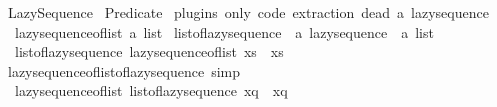 %
\begin{isabellebody}%
%
%
\isadelimdocument
%
\endisadelimdocument
%
\isatagdocument
%
\isamarkuptrue%
%
\endisatagdocument
{\isafolddocument}%
%
\isadelimdocument
%
\endisadelimdocument
%
\isadelimtheory
%
\endisadelimtheory
%
\isatagtheory
{}\isamarkupfalse%
\ Lazy{\isacharunderscore}{\kern0pt}Sequence\isanewline
{}\ Predicate\isanewline
{}%
\endisatagtheory
{\isafoldtheory}%
%
\isadelimtheory
%
\endisadelimtheory
%
\isadelimdocument
%
\endisadelimdocument
%
\isatagdocument
%
\isamarkuptrue%
%
\endisatagdocument
{\isafolddocument}%
%
\isadelimdocument
%
\endisadelimdocument
{}\isamarkupfalse%
\ {\isacharparenleft}{\kern0pt}plugins\ only{\isacharcolon}{\kern0pt}\ code\ extraction{\isacharparenright}{\kern0pt}\ {\isacharparenleft}{\kern0pt}dead\ {\isacharprime}{\kern0pt}a{\isacharparenright}{\kern0pt}\ lazy{\isacharunderscore}{\kern0pt}sequence\ {\isacharequal}{\kern0pt}\isanewline
\ \ lazy{\isacharunderscore}{\kern0pt}sequence{\isacharunderscore}{\kern0pt}of{\isacharunderscore}{\kern0pt}list\ {\isachardoublequoteopen}{\isacharprime}{\kern0pt}a\ list{\isachardoublequoteclose}\isanewline
\isanewline
{}\isamarkupfalse%
\ list{\isacharunderscore}{\kern0pt}of{\isacharunderscore}{\kern0pt}lazy{\isacharunderscore}{\kern0pt}sequence\ {\isacharcolon}{\kern0pt}{\isacharcolon}{\kern0pt}\ {\isachardoublequoteopen}{\isacharprime}{\kern0pt}a\ lazy{\isacharunderscore}{\kern0pt}sequence\ {\isasymRightarrow}\ {\isacharprime}{\kern0pt}a\ list{\isachardoublequoteclose}\isanewline
{}\isanewline
\ \ {\isachardoublequoteopen}list{\isacharunderscore}{\kern0pt}of{\isacharunderscore}{\kern0pt}lazy{\isacharunderscore}{\kern0pt}sequence\ {\isacharparenleft}{\kern0pt}lazy{\isacharunderscore}{\kern0pt}sequence{\isacharunderscore}{\kern0pt}of{\isacharunderscore}{\kern0pt}list\ xs{\isacharparenright}{\kern0pt}\ {\isacharequal}{\kern0pt}\ xs{\isachardoublequoteclose}\isanewline
\isanewline
{}\isamarkupfalse%
\ lazy{\isacharunderscore}{\kern0pt}sequence{\isacharunderscore}{\kern0pt}of{\isacharunderscore}{\kern0pt}list{\isacharunderscore}{\kern0pt}of{\isacharunderscore}{\kern0pt}lazy{\isacharunderscore}{\kern0pt}sequence\ {\isacharbrackleft}{\kern0pt}simp{\isacharbrackright}{\kern0pt}{\isacharcolon}{\kern0pt}\isanewline
\ \ {\isachardoublequoteopen}lazy{\isacharunderscore}{\kern0pt}sequence{\isacharunderscore}{\kern0pt}of{\isacharunderscore}{\kern0pt}list\ {\isacharparenleft}{\kern0pt}list{\isacharunderscore}{\kern0pt}of{\isacharunderscore}{\kern0pt}lazy{\isacharunderscore}{\kern0pt}sequence\ xq{\isacharparenright}{\kern0pt}\ {\isacharequal}{\kern0pt}\ xq{\isachardoublequoteclose}\isanewline

\end{isabellebody}
